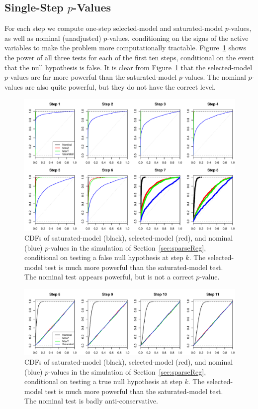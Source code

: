 \documentclass{article}
\begin{document}
\subsection{Single-Step $p$-Values}

For each step we compute one-step selected-model and saturated-model $p$-values, as well as nominal (unadjusted) $p$-values, conditioning on the signs of the active variables to make the problem more computationally tractable. Figure~\ref{fig:simulation_null_false} shows the power of all three tests for each of the first ten steps, conditional on the event that the null hypothesis is false. It is clear from Figure~\ref{fig:simulation_null_false} that the selected-model $p$-values are far more powerful than the saturated-model $p$-values. The nominal $p$-values are also quite powerful, but they do not have the correct level.

\begin{figure}
  \centering
  \includegraphics[width=.8\textwidth]{figs/simulation_snr_5_alpha_05_null_false.pdf}
  \caption{CDFs of saturated-model (black), selected-model (red), and nominal (blue) $p$-values in the simulation of Section~\ref{sec:sparseReg}, conditional on testing a false null hypothesis at step $k$. The selected-model test is much more powerful than the saturated-model test. The nominal test appears powerful, but is not a correct $p$-value.}
  \label{fig:simulation_null_false}
\end{figure}

\begin{figure}
  \centering
  \includegraphics[width=.8\textwidth]{figs/simulation_snr_5_alpha_05_null_true.pdf}
  \caption{CDFs of saturated-model (black), selected-model (red), and nominal (blue) $p$-values in the simulation of Section~\ref{sec:sparseReg}, conditional on testing a true null hypothesis at step $k$. The selected-model test is much more powerful than the saturated-model test. The nominal test is badly anti-conservative.}
  \label{fig:simulation_null_true}
\end{figure}
\end{document}
